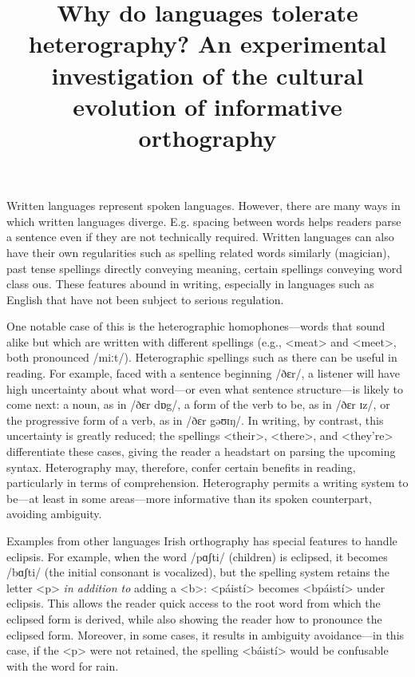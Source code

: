 \documentclass[doc,biblatex]{apa7}
\title{Why do languages tolerate heterography? An experimental investigation of the cultural evolution of informative orthography}
\begin{document}
\maketitle

\noindent
Written languages represent spoken languages. However, there are many ways in which written languages diverge. E.g. spacing between words helps readers parse a sentence even if they are not technically required. Written languages can also have their own regularities such as spelling related words similarly (magician), past tense spellings directly conveying meaning, certain spellings conveying word class ous. These features abound in writing, especially in languages such as English that have not been subject to serious regulation.

One notable case of this is the heterographic homophones---words that sound alike but which are written with different spellings (e.g., <meat> and <meet>, both pronounced /miːt/). Heterographic spellings such as there can be useful in reading. For example, faced with a sentence beginning /ðɛr/, a listener will have high uncertainty about what word---or even what sentence structure---is likely to come next: a noun, as in /ðɛr dɒg/, a form of the verb to be, as in /ðɛr ɪz/, or the progressive form of a verb, as in /ðɛr gəʊɪŋ/. In writing, by contrast, this uncertainty is greatly reduced; the spellings <their>, <there>, and <they're> differentiate these cases, giving the reader a headstart on parsing the upcoming syntax. Heterography may, therefore, confer certain benefits in reading, particularly in terms of comprehension. Heterography permits a writing system to be---at least in some areas---more informative than its spoken counterpart, avoiding ambiguity.

Examples from other languages Irish orthography has special features to handle eclipsis. For example, when the word /pɑʃti/ (children) is eclipsed, it becomes /bɑʃti/ (the initial consonant is vocalized), but the spelling system retains the letter <p> \textit{in addition to} adding a <b>: <páistí> becomes <bpáistí> under eclipsis. This allows the reader quick access to the root word from which the eclipsed form is derived, while also showing the reader how to pronounce the eclipsed form. Moreover, in some cases, it results in ambiguity avoidance---in this case, if the <p> were not retained, the spelling <báistí> would be confusable with the word for rain.
\end{document}
